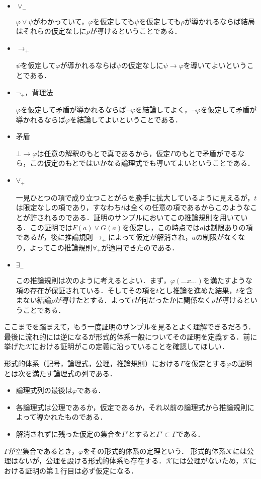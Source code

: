 \documentclass[10pt,b5paper,papersize,dvipdfmx]{jsbook}
\newenvironment{TEIRI}[1]{
  \itemize
  \item [\headfont #1]
}{\enditemize}
\begin{document}
\begin{itemize}
  \item $\lor_-$ \par
    $\varphi \lor \psi$がわかっていて，$\varphi$を仮定しても$\psi$を仮定しても$\rho$が導かれるならば結局はそれらの仮定なしに$\rho$が導けるということである．
  \item $\to_+$ \par
    $\psi$を仮定して$\varphi$が導かれるならば$\psi$の仮定なしに$\psi \to \varphi$を導いてよいということである．
  \item $\lnot_+$，背理法 \par
    $\varphi$を仮定して矛盾が導かれるならば$\lnot \varphi$を結論してよく，$\lnot \varphi$を仮定して矛盾が導かれるならば$\varphi$を結論してよいということである．
  \item 矛盾 \par
    $\bot \to \varphi$は任意の解釈のもとで真であるから，仮定$\Gamma$のもとで矛盾がでるなら，この仮定のもとではいかなる論理式でも導いてよいということである．
  \item $\forall_+$ \par
    一見ひとつの項で成り立つことがらを勝手に拡大しているように見えるが，$t$は限定なしの項であり，すなわち$t$は全くの任意の項であるからこのようなことが許されるのである．証明のサンプルにおいてこの推論規則を用いている．この証明では$F(a)\lor G(a)$を仮定し，この時点では$a$は制限ありの項であるが，後に推論規則$\to_+$によって仮定が解消され，$a$の制限がなくなり，よってこの推論規則$\forall_+$が適用できたのである．
  \item $\exists_-$ \par
    この推論規則は次のように考えるとよい．まず，$\varphi(\dots x \dots)$を満たすような項の存在が保証されている．そしてその項を$t$とし推論を進めた結果，$t$を含まない結論$\rho$が導けたとする．よって$t$が何だったかに関係なく$\rho$が導けるということである．
\end{itemize}
ここまでを踏まえて，もう一度証明のサンプルを見るとよく理解できるだろう．最後に流れ的には逆になるが形式的体系一般についてその証明を定義する．前に挙げた$\mathcal K$における証明がこの定義に沿っていることを確認してほしい．
\begin{TEIRI}{定義}
  形式的体系（記号，論理式，公理，推論規則）における$\Gamma$を仮定とする$\varphi$の証明とは次を満たす論理式の列である．
  \begin{itemize}
    \item 論理式列の最後は$\varphi$である．
    \item 各論理式は公理であるか，仮定であるか，それ以前の論理式から推論規則によって導かれたものである．
    \item 解消されずに残った仮定の集合を$\Gamma'$とすると$\Gamma'\subset \Gamma$である．
  \end{itemize}
\end{TEIRI}
$\Gamma$が空集合であるとき，$\varphi$をその形式的体系の定理という．
形式的体系$\mathcal K$には公理はないが，公理を設ける形式的体系も存在する．$\mathcal K$には公理がないため，$\mathcal K$における証明の第１行目は必ず仮定になる．
\end{document}
